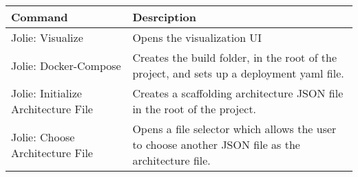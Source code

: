 \begin{table}[h]
    \advance
    \leftskip-0.5cm
    \begin{tabular}{p{0.35\linewidth} | p{0.65\linewidth}}
    \toprule
    \textbf{Command} & \textbf{Desrciption} \\\midrule
    Jolie: Visualize & Opens the visualization UI \\\midrule
    Jolie: Docker-Compose & Creates the build folder, in the root of the project, and sets up a deployment yaml file. \\\midrule
    Jolie: Initialize Architecture File & Creates a scaffolding architecture JSON file in the root of the project.   \\\midrule
    Jolie: Choose Architecture File & Opens a file selector which allows the user to choose another JSON file as the architecture file. \\\midrule
    \end{tabular}
    \end{table}